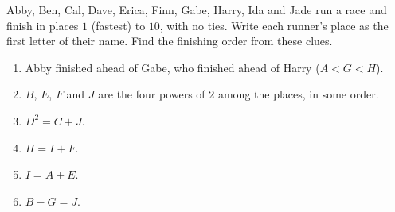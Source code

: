 Abby, Ben, Cal, Dave, Erica, Finn, Gabe, Harry, Ida and Jade run a race and finish in places $1$ (fastest) to $10$, with no ties. Write each runner's place as the first letter of their name. Find the finishing order from these clues.
\begin{enumerate}
\item Abby finished ahead of Gabe, who finished ahead of Harry ($A<G<H$).
\item $B$, $E$, $F$ and $J$ are the four powers of $2$ among the places, in some order.
\item $D^2=C+J$.
\item $H=I+F$.
\item $I=A+E$.
\item $B-G=J$.
\end{enumerate}
